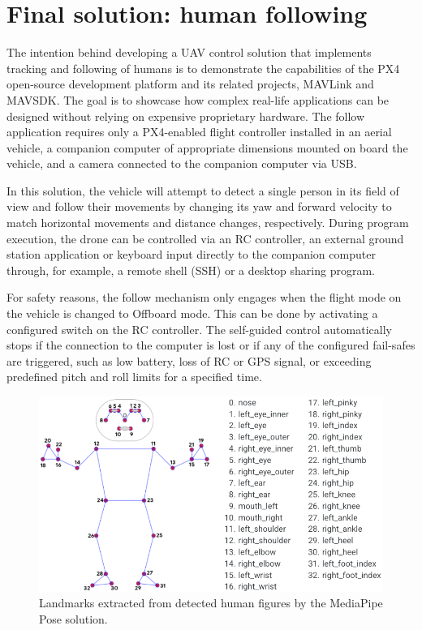 \section{Final solution: human following}
\label{sec:follow}

The intention behind developing a UAV control solution that implements tracking and following of humans is to demonstrate the capabilities of the PX4 open-source development platform and its related projects, MAVLink and MAVSDK. The goal is to showcase how complex real-life applications can be designed without relying on expensive proprietary hardware. The follow application requires only a PX4-enabled flight controller installed in an aerial vehicle, a companion computer of appropriate dimensions mounted on board the vehicle, and a camera connected to the companion computer via USB.

In this solution, the vehicle will attempt to detect a single person in its field of view and follow their movements by changing its yaw and forward velocity to match horizontal movements and distance changes, respectively.
During program execution, the drone can be controlled via an RC controller, an external ground station application or keyboard input directly to the companion computer through, for example, a remote shell (SSH) or a desktop sharing program.

For safety reasons, the follow mechanism only engages when the flight mode on the vehicle is changed to Offboard mode. This can be done by activating a configured switch on the RC controller. The self-guided control automatically stops if the connection to the computer is lost or if any of the configured fail-safes are triggered, such as low battery, loss of RC or GPS signal, or exceeding predefined pitch and roll limits for a specified time.

\begin{figure}
  \centering
  \includegraphics[width=\textwidth, keepaspectratio]{img/pose-landmarks.png}
  \caption{Landmarks extracted from detected human figures by the MediaPipe Pose solution.}
  \label{fig:pose-landmarks}
\end{figure}

